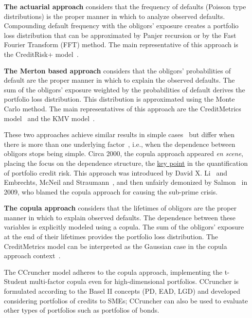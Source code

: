 \documentclass[11pt,fleqn]{book} %
\begin{document}
\textbf{The actuarial approach} considers that the frequency of defaults 
(Poisson type distributions) is the proper manner in which to analyze observed 
defaults. Compounding default frequency with the obligors' exposure creates a
portfolio loss distribution that can be approximated by Panjer recursion or 
by the Fast Fourier Transform (FFT) method. The main representative of this 
approach is the CreditRisk+ model~\cite{creditrisk+:1997}.

\textbf{The Merton based approach} considers that the obligors' probabilities 
of default are the proper manner in which to explain the observed defaults.
The sum of the obligors' exposure weighted by the probabilities of default 
derives the portfolio loss distribution. This distribution is approximated 
using the Monte Carlo method. The main representatives of this approach are the 
CreditMetrics\texttrademark{} model~\cite{cmetrics:1997} and the KMV 
model~\cite{kmv:2003}. 

These two approaches achieve similar results in simple cases~\cite{koyluoglu:1998}
but differ when there is more than one underlying factor~\cite{bluhm:2001}, 
i.e., when the dependence between obligors stops being simple.
Circa 2000, the copula approach appeared \textit{en scene}, placing the focus 
on the dependence structure, the \underline{key point} in the quantification 
of portfolio credit risk. This approach was introduced by David X. Li~\cite{li:2000}
and Embrechts, McNeil and Straumann~\cite{embrechts:2002}, and then 
unfairly demonized by Salmon~\cite{salmon:2009} in 2009, who blamed the 
copula approach for causing the sub-prime crisis.

\textbf{The copula approach} considers that the lifetimes of obligors are
the proper manner in which to explain observed defaults. The dependence between 
these variables is explicitly modeled using a copula. The sum of the obligors' 
exposure at the end of their lifetimes provides the portfolio loss 
distribution. The CreditMetrics\texttrademark{} model can be interpreted as 
the Gaussian case in the copula approach context~\cite{li:2000}.

The CCruncher model adheres to the copula approach, implementing the 
t-Student multi-factor copula even for high-dimensional portfolios. 
CCruncher is formulated according to the Basel II concepts (PD, EAD, LGD) 
and developed considering portfolios of credits to SMEs; CCruncher can also 
be used to evaluate other types of portfolios such as portfolios of bonds.
\end{document}
